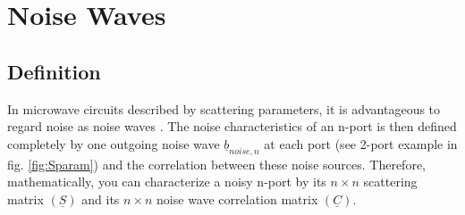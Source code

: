 %
%
%
%

\chapter{Noise Waves}

\section{Definition}

In microwave circuits described by scattering parameters, it is
advantageous to regard noise as noise waves \cite{Wedge}.  The noise
characteristics of an n-port is then defined completely by one
outgoing noise wave $\underline{b}_{noise,n}$ at each port (see 2-port
example in fig. \ref{fig:Sparam}) and the correlation between these
noise sources.  Therefore, mathematically, you can characterize a
noisy n-port by its $n\times n$ scattering matrix $(\underline{S})$
and its $n\times n$ noise wave correlation matrix $(\underline{C})$.

